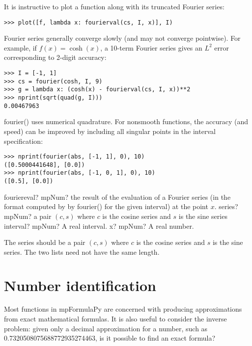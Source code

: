 It is instructive to plot a function along with its truncated Fourier series:

\begin{lstlisting}
>>> plot([f, lambda x: fourierval(cs, I, x)], I)
\end{lstlisting}

Fourier series generally converge slowly (and may not converge pointwise). For example, if $f(x) = \cosh(x)$, a 10-term Fourier series gives an $L^2$ error corresponding to 2-digit accuracy:

\begin{lstlisting}
>>> I = [-1, 1]
>>> cs = fourier(cosh, I, 9)
>>> g = lambda x: (cosh(x) - fourierval(cs, I, x))**2
>>> nprint(sqrt(quad(g, I)))
0.00467963
\end{lstlisting}

fourier() uses numerical quadrature. For nonsmooth functions, the accuracy (and speed) can be improved by including all singular points in the interval specification:

\begin{lstlisting}
>>> nprint(fourier(abs, [-1, 1], 0), 10)
([0.5000441648], [0.0])
>>> nprint(fourier(abs, [-1, 0, 1], 0), 10)
([0.5], [0.0])
\end{lstlisting}


\vspace{0.6cm}

\begin{mpFunctionsExtract}
	\mpFunctionThree
	{fouriereval? mpNum? the result of the evaluation of a Fourier series (in the format computed by by fourier() for the given interval) at the point $x$.}
	{series? mpNum? a pair $(c,s)$ where $c$ is the cosine series and $s$ is the sine series}
	{interval? mpNum? A real interval.}	
	{x? mpNum? A real number.}		
\end{mpFunctionsExtract}


\vpara
The series should be a pair $(c,s)$ where $c$ is the cosine series and $s$ is the sine series. The two lists need not have the same length.






\chapter{Number identification}

Most functions in mpFormulaPy are concerned with producing approximations from exact mathematical formulas. It is also useful to consider the inverse problem: given only a decimal approximation for a number, such as 0.7320508075688772935274463, is it possible to find an exact formula?

